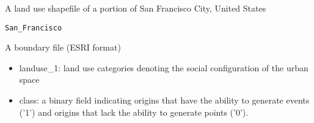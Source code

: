 \documentclass[a4paper]{book}
\begin{document}
%
\begin{Description}\relax
A land use shapefile of a portion of
San Francisco City, United States
\end{Description}
%
\begin{Usage}
\begin{verbatim}
San_Francisco
\end{verbatim}
\end{Usage}
%
\begin{Format}
A boundary file (ESRI format)
\begin{itemize}

\item{} landuse\_1: land use categories denoting
the social configuration of the urban space
\item{} class: a binary field indicating origins that
have the ability to generate events ('1') and origins
that lack the ability to generate points ('0').

\end{itemize}

\end{Format}
\printindex{}
\end{document}
